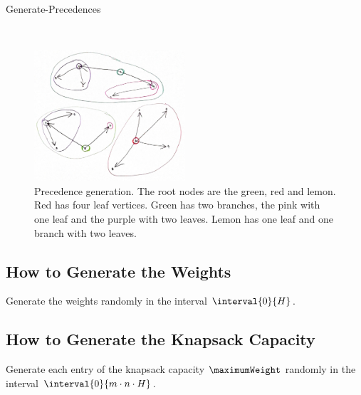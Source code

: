 \begin{algorithm}
    \caption{Generate-Precedences}
    \label{algorith:generate-precedences}
    \begin{algorithmic}[1]
        \\
    \end{algorithmic}
\end{algorithm}

\begin{figure}[ht!]
    \centering
    \includegraphics[width=0.5\textwidth]{images/precedence_construction.jpg}
    \caption{Precedence generation. The root nodes are the green, red and lemon. Red has four leaf vertices. Green has two branches, the pink with one leaf and the purple with two leaves. Lemon has one leaf and one branch with two leaves.}
    \label{fig:precedence-generation}
\end{figure}

\subsection{How to Generate the Weights}

Generate the weights randomly in the interval $\interval{0}{H}$.

\subsection{How to Generate the Knapsack Capacity}

Generate each entry of the knapsack capacity $\maximumWeight$ randomly in the interval $\interval{0}{m \cdot n \cdot H}$.
